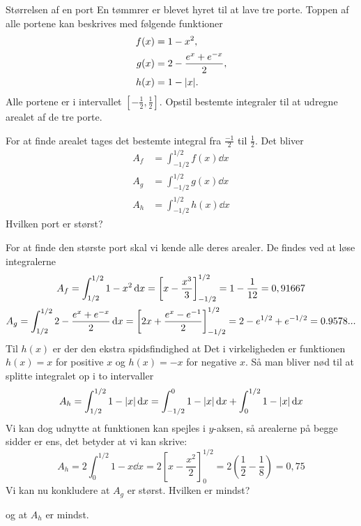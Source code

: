\begin{opgave}[2]{Størrelsen af en port}
    En tømmrer er blevet hyret til at lave tre porte.
    Toppen af alle portene kan beskrives med følgende funktioner
    \begin{align*}
        f(x)&=1-x^2,\\
        g(x)&=2-\frac{e^x+e^{-x}}{2},\\
        h(x) &= 1-\abs{x}.
    \end{align*}
    Alle portene er i intervallet $[-\frac{1}{2},\frac{1}{2}]$.
    \opg Opstil bestemte integraler til at udregne arealet af de tre porte.
    
    For at finde arealet tages det bestemte integral fra $\frac{-1}{2}$ til $\frac{1}{2}$. Det bliver
    \begin{align*}
        A_f&=\int_{-1/2}^{1/2}f(x)\dd{x}\\
        A_g&=\int_{-1/2}^{1/2}g(x)\dd{x}\\
        A_h&=\int_{-1/2}^{1/2}h(x)\dd{x}
    \end{align*}
    \opg Hvilken port er størst?
    
    For at finde den største port skal vi kende alle deres arealer. De findes ved at løse integralerne
    \begin{gather*}
        A_f=\int_{\-1/2}^{1/2}1-x^2\dd{x}=\left[x-\frac{x^3}{3}\right]_{-1/2}^{1/2}=1-\frac{1}{12}=0,91667\\
        A_g=\int_{\-1/2}^{1/2}2-\frac{e^x+e^{-x}}{2}\dd{x}=\left[2x+\frac{e^x-e^{-1}}{2}\right]_{-1/2}^{1/2}=2-e^{1/2}+e^{-1/2}=0.9578...
    \end{gather*}
    Til $h(x)$ er der den ekstra spidsfindighed at Det i virkeligheden er funktionen $h(x)=x$ for positive $x$ og $h(x)=-x$ for negative $x$.
    Så man bliver nød til at splitte integralet op i to intervaller
    $$
    A_h=\int_{\-1/2}^{1/2}1-\abs{x}\dd{x}=\int_{-1/2}^{0}1-\abs{x}\dd{x}+\int_{0}^{1/2}1-\abs{x}\dd{x}
    $$
    Vi kan dog udnytte at funktionen kan spejles i $y$-aksen, så arealerne på begge sidder er ens, det betyder at vi kan skrive:
    $$
    A_h=2\int_0^{1/2}1-x\dd{x}=2\left[x-\frac{x^2}{2}\right]_0^{1/2}=2(\frac{1}{2}-\frac{1}{8})=0,75
    $$
    Vi kan nu konkludere at $A_g$ er størst.
    \opg Hvilken er mindst?
    
    og at $A_h$ er mindst.
\end{opgave}

